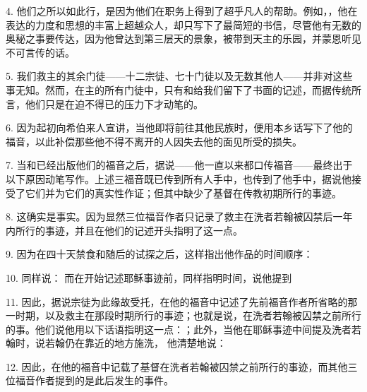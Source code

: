 4. 他们之所以如此行，是因为他们在职务上得到了超乎凡人的帮助。例如，，他在表达的力度和思想的丰富上超越众人，却只写下了最简短的书信，尽管他有无数的奥秘之事要传达，因为他曾达到第三层天的景象，被带到天主的乐园，并蒙恩听见不可言传的话。\par

5. 我们救主的其余门徒——十二宗徒、七十门徒以及无数其他人——并非对这些事无知。然而，在主的所有门徒中，只有和给我们留下了书面的记述，而据传统所言，他们只是在迫不得已的压力下才动笔的。\par

6. 因为起初向希伯来人宣讲，当他即将前往其他民族时，便用本乡话写下了他的福音，以此补偿那些他不得不离开的人因失去他的面见所受的损失。\par

7. 当和已经出版他们的福音之后，据说——他一直以来都口传福音——最终出于以下原因动笔写作。上述三福音既已传到所有人手中，也传到了他手中，据说他接受了它们并为它们的真实性作证；但其中缺少了基督在传教初期所行的事迹。\par

8. 这确实是事实。因为显然三位福音作者只记录了救主在洗者若翰被囚禁后一年内所行的事迹，并且在他们的记述开头指明了这一点。\par

9. 因为在四十天禁食和随后的试探之后，这样指出他作品的时间顺序：\par

10. 同样说： 而在开始记述耶稣事迹前，同样指明时间，说他提到 \par

11. 因此，据说宗徒为此缘故受托，在他的福音中记述了先前福音作者所省略的那一时期，以及救主在那段时期所行的事迹；也就是说，在洗者若翰被囚禁之前所行的事。他们说他用以下话语指明这一点：；此外，当他在耶稣事迹中间提及洗者若翰时，说若翰仍在靠近的地方施洗， 他清楚地说：\par

12. 因此，在他的福音中记载了基督在洗者若翰被囚禁之前所行的事迹，而其他三位福音作者提到的是此后发生的事件。\par

